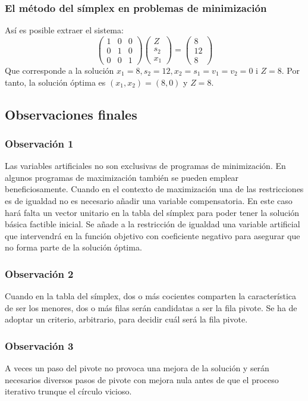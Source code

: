 \documentclass{beamer}
\begin{document}
\begin{frame}
\frametitle{El m\'etodo del s\'implex en problemas de minimizaci\'on}
As\'i es posible extraer el sistema:
\[\left(
\begin{array}{ccc}
1&0&0 \\ 0&1&0\\ 0&0&1
\end{array}
\right)
\left(
\begin{array}{c}
Z\\s_2\\x_1
\end{array}
\right) = \left(
\begin{array}{c}
8\\ 12\\ 8\end{array}
\right)
\]
Que corresponde a la soluci\'on $x_1 = 8, s_2=12, x_2=s_1= v_1 =v_2=0$ i  $Z=8$. Por tanto, la soluci\'on \'optima es $(x_1,x_2) = (8,0)$ y $Z=8$.
\end{frame}

\subsection{Observaciones finales}


\begin{frame}
\frametitle{Observaci\'on 1}
Las variables artificiales no son exclusivas de programas de minimizaci\'on. En algunos programas de maximizaci\'on tambi\'en se pueden emplear beneficiosamente.
Cuando en el contexto de maximizaci\'on una de las restricciones es de igualdad no es necesario a\~nadir una variable compensatoria. En este caso har\'a falta un vector unitario en la tabla del s\'implex para poder tener la soluci\'on b\'asica factible inicial. Se a\~nade a la restricci\'on de igualdad una variable artificial que intervendr\'a en la funci\'on objetivo con coeficiente negativo para asegurar que no forma parte de la soluci\'on \'optima.
\end{frame}


\begin{frame}
\frametitle{Observaci\'on 2}
Cuando en la tabla del s\'implex, dos o m\'as cocientes comparten la caracter\'istica de ser los menores, dos o m\'as filas ser\'an candidatas a ser la fila pivote. Se ha de adoptar un criterio, arbitrario, para decidir cu\'al ser\'a la fila pivote.
\end{frame}


\begin{frame}
\frametitle{Observaci\'on 3}
A veces un paso del pivote no provoca una mejora de la soluci\'on y ser\'an necesarios diversos pasos de pivote con mejora nula antes de que el proceso iterativo trunque el c\'irculo vicioso.
\end{frame}
\end{document}
